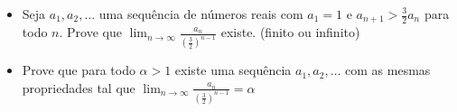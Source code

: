\begin{itemize}
\item[(a)] Seja \(a_1,a_2,\dots\) uma sequência de números reais com \(a_1=1\) e \(a_{n+1}>\frac32 a_n\) para todo \(n\). Prove que \(\lim_{n\rightarrow\infty}\frac{a_n}{\left(\frac32\right)^{n-1}}\) existe. (finito ou infinito)

\item[(b)] Prove que para todo \(\alpha>1\) existe uma sequência \(a_1,a_2,\dots\) com as mesmas propriedades tal que \(\lim_{n\rightarrow\infty}\frac{a_n}{\left(\frac32\right)^{n-1}}=\alpha\)
\end{itemize}
